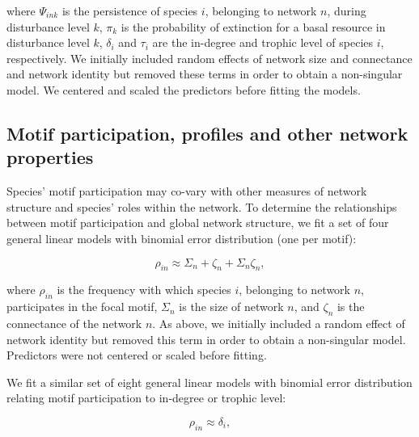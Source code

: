 \documentclass[12pt]{article}
\begin{document}
\begin{spacing}{2.0}
            \noindent where $\Psi_{ink}$ is the persistence of species $i$, belonging to network $n$, during disturbance level $k$, $\pi_k$ is the probability of extinction for a basal resource in disturbance level $k$, 
            $\delta_{i}$ and $\tau_i$ are the in-degree and trophic level of species $i$, respectively.
            We initially included random effects of network size and connectance and network identity but removed these terms in order to obtain a non-singular model.
            We centered and scaled the predictors before fitting the models.


    \subsection{Motif participation, profiles and other network properties}

        Species' motif participation may co-vary with other measures of network structure and species' roles within the network.
        To determine the relationships between motif participation and global network structure, we fit a set of four general linear models with binomial error distribution (one per motif):

        \begin{spacing}{1.0}
        \begin{equation}
            \rho_{in} \approx \Sigma_{n} + \zeta_{n} + \Sigma_{n}\zeta_{n},
            \label{partic_SC}
        \end{equation}
        \end{spacing}
        
        \noindent where $\rho_{in}$ is the frequency with which species $i$, belonging to network $n$, participates in the focal motif, $\Sigma_{n}$ is the size of network $n$, and $\zeta_{n}$ is the connectance of the network $n$.
        As above, we initially included a random effect of network identity but removed this term in order to obtain a non-singular model.
        Predictors were not centered or scaled before fitting.

       
        We fit a similar set of eight general linear models with binomial error distribution relating motif participation to in-degree or trophic level:

        \begin{spacing}{1.0}
        \begin{multicols}{2}
        \begin{equation}
            \rho_{in} \approx \delta_{i},
            \label{partic_deg}
        \end{equation}


\end{multicols}
\end{spacing}
\end{spacing}
\end{document}
